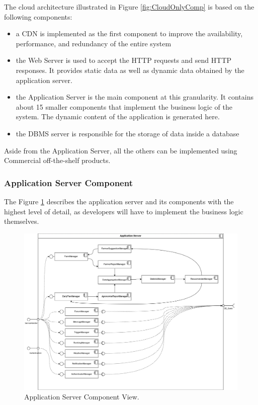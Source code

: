 The cloud architecture illustrated in Figure \ref{fig:CloudOnlyComp} is based on the following components:
\begin{itemize}
	\item a CDN is implemented as the first component to improve the availability, performance, and redundancy of the entire system
	\item the Web Server is used to accept the HTTP requests and send HTTP responses. It provides static data as well as dynamic data obtained by the application server.
	\item the Application Server is the main component at this granularity. It contains about 15 smaller components that implement the business logic of the system. The dynamic content of the application is generated here.
	\item the DBMS server is responsible for the storage of data inside a database
\end{itemize}
Aside from the Application Server, all the others can be implemented using Commercial off-the-shelf products. \\

\subsubsection{Application Server Component}

The Figure \ref{fig:ApplicationServerOnlyComp} describes the application server and its components with the highest level of detail, as developers will have to implement the business logic themselves.\\

\begin{figure}[hbt!]
\centering
\includegraphics[width=\textwidth]{../images_diagrams/dd/component_only_application.png}
\caption{Application Server Component View.}
\label{fig:ApplicationServerOnlyComp}
\end{figure}

